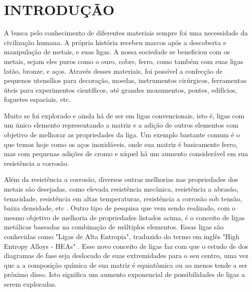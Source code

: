 
\chapter{INTRODUÇÃO}

A busca pelo conhecimento de diferentes materiais sempre foi uma necessidade da civilização humana. A própria história recebeu marcos após a descoberta e manipulação de metais, e suas ligas. A nossa sociedade se beneficiou com os metais, sejam eles puros como o ouro, cobre, ferro, como também com suas ligas latão, bronze, e aços. Através desses materiais, foi possível a confecção de pequenos utensílios para decoração, moedas, instrumentos cirúrgicos, ferramentas úteis para experimentos científicos, até grandes monumentos, pontes, edifícios, foguetes espaciais, etc.

Muito se foi explorado e ainda há de ser em ligas convencionais, isto é, ligas com um único elemento representando a matriz e a adição de outros elementos com objetivo de melhorar as propriedades da liga. Um exemplo bastante comum é o que temos hoje como os aços inoxidáveis, onde sua matriz é basicamente ferro, mas com pequenas adições de cromo e níquel há um aumento considerável em sua resistência a corrosão. 

Além da resistência a corrosão, diversos outras melhorias nas propriedades dos metais são desejadas, como elevada resistência mecânica, resistência a abrasão, tenacidade, resistência em altas temperaturas, resistência a corrosão sob tensão, baixa densidade, etc \cite{jien2006recent}.               
Outro tipo de pesquisa que vem sendo realizado, com o mesmo objetivo de melhoria de propriedades listados acima, é o conceito de ligas metálicas baseadas na combinação de múltiplos elementos. Essas ligas são conhecidas como "Ligas de Alta Entropia", traduzido do termo em inglês "High Entropy Alloys - HEAs" \cite{yeh2004nanostructured}. Esse novo conceito de ligas faz com que o estudo de dos diagramas de fase seja deslocado de suas extremidades para o seu centro, uma vez que a a composição química de sua matriz é equiatômica ou ao menos tende a ser próximo disso. Isto significa um aumento exponencial de possibilidades de ligas a serem exploradas.



\bigskip
